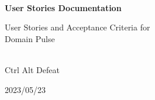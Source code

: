 \begin{titlepage}
    \centering


    
    \vspace{2cm}
    \hrulefill\\
    \vspace{1cm}
    {\Huge\bfseries User Stories Documentation}
    
    \vspace{1cm}
    
    {\Large User Stories and Acceptance Criteria for\\Domain Pulse}\\
    \vspace{1cm}
    \hrulefill\\
    
    \vfill
    
    {\large Ctrl Alt Defeat}
    
    \vspace{1cm}
    
    {\large 2023/05/23}\\

    
\end{titlepage}